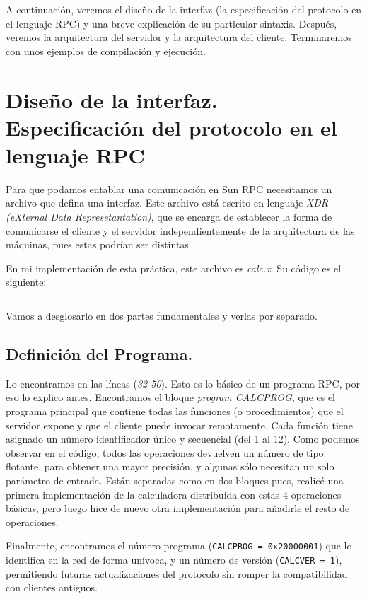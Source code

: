 \documentclass[a4paper,12pt]{article}
\begin{document}
	A continuación, veremos el diseño de la interfaz (la especificación del
	protocolo en el lenguaje RPC) y una breve explicación de su particular
	sintaxis. Después, veremos la arquitectura del servidor y la arquitectura del
	cliente. Terminaremos con unos ejemplos de compilación y ejecución.

\section{Diseño de la interfaz. Especificación del protocolo en el lenguaje RPC}

	Para que podamos entablar una comunicación en Sun RPC necesitamos un archivo
	que defina una interfaz. Este archivo está escrito en lenguaje \textit{XDR
		(eXternal Data Represetantation)}, que se encarga de establecer la forma de
	comunicarse el cliente y el servidor independientemente de la arquitectura de
	las máquinas, pues estas podrían ser distintas.
	
	En mi implementación de esta práctica, este archivo es \textit{calc.x}. Su
	código es el siguiente: \inputminted[linenos, frame=lines,
		fontsize=\footnotesize]{C}{../codigo/calc.x}
	
	Vamos a desglosarlo en dos partes fundamentales y verlas por separado.
	
	\subsection{Definición del Programa.}
		Lo encontramos en las líneas (\textit{32-50}). Esto es lo básico de un programa
		RPC, por eso lo explico antes. Encontramos el bloque \textit{program CALCPROG},
		que es el programa principal que contiene todas las funciones (o
		procedimientos) que el servidor expone y que el cliente puede invocar
		remotamente. Cada función tiene asignado un número identificador único y
		secuencial (del 1 al 12). Como podemos observar en el código, todos las
		operaciones devuelven un número de tipo flotante, para obtener una mayor
		precisión, y algunas sólo necesitan un solo parámetro de entrada. Están
		separadas como en dos bloques pues, realicé una primera implementación de la
		calculadora distribuida con estas 4 operaciones básicas, pero luego hice de
		nuevo otra implementación para añadirle el resto de operaciones.
		
		Finalmente, encontramos el número programa (\texttt{CALCPROG = 0x20000001}) que
		lo identifica en la red de forma unívoca, y un número de versión
		(\texttt{CALCVER = 1}), permitiendo futuras actualizaciones del protocolo sin
		romper la compatibilidad con clientes antiguos.
	
\end{document}

